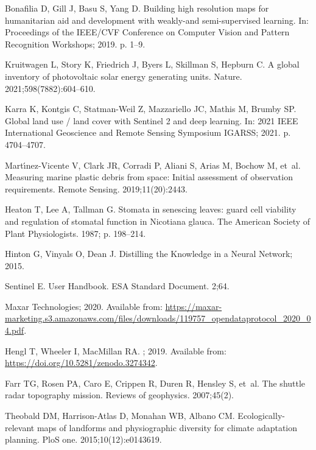 \documentclass[10pt,letterpaper]{article}
\begin{document}
\begin{thebibliography}{10}
Bonafilia D, Gill J, Basu S, Yang D.
\newblock Building high resolution maps for humanitarian aid and development
  with weakly-and semi-supervised learning.
\newblock In: Proceedings of the IEEE/CVF Conference on Computer Vision and
  Pattern Recognition Workshops; 2019. p. 1--9.

Kruitwagen L, Story K, Friedrich J, Byers L, Skillman S, Hepburn C.
\newblock A global inventory of photovoltaic solar energy generating units.
\newblock Nature. 2021;598(7882):604--610.

Karra K, Kontgis C, Statman-Weil Z, Mazzariello JC, Mathis M, Brumby SP.
\newblock Global land use / land cover with Sentinel 2 and deep learning.
\newblock In: 2021 IEEE International Geoscience and Remote Sensing Symposium
  IGARSS; 2021. p. 4704--4707.

Mart{\'\i}nez-Vicente V, Clark JR, Corradi P, Aliani S, Arias M, Bochow M,
  et~al.
\newblock Measuring marine plastic debris from space: Initial assessment of
  observation requirements.
\newblock Remote Sensing. 2019;11(20):2443.

Heaton T, Lee A, Tallman G.
\newblock Stomata in senescing leaves: guard cell viability and regulation of
  stomatal function in Nicotiana glauca.
\newblock The American Society of Plant Physiologists. 1987; p. 198–214.

Hinton G, Vinyals O, Dean J. Distilling the Knowledge in a Neural Network;
  2015.

Sentinel E.
\newblock User Handbook.
\newblock ESA Standard Document. 2;64.

Maxar Technologies; 2020.
\newblock Available from:
  \url{https://maxar-marketing.s3.amazonaws.com/files/downloads/119757_opendataprotocol_2020_04.pdf}.

Hengl T, Wheeler I, MacMillan RA.
; 2019.
\newblock Available from: \url{https://doi.org/10.5281/zenodo.3274342}.

Farr TG, Rosen PA, Caro E, Crippen R, Duren R, Hensley S, et~al.
\newblock The shuttle radar topography mission.
\newblock Reviews of geophysics. 2007;45(2).

Theobald DM, Harrison-Atlas D, Monahan WB, Albano CM.
\newblock Ecologically-relevant maps of landforms and physiographic diversity
  for climate adaptation planning.
\newblock PloS one. 2015;10(12):e0143619.


\end{thebibliography}
\end{document}
